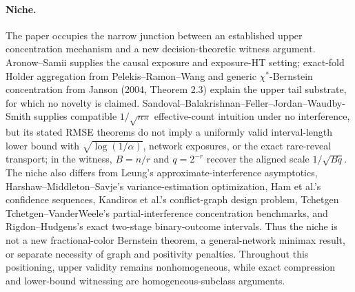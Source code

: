 \documentclass{article}
\begin{document}
\paragraph{Niche.} The paper occupies the narrow junction between an established upper concentration mechanism and a new decision-theoretic witness argument. Aronow--Samii supplies the causal exposure and exposure-HT setting; exact-fold Holder aggregation from Pelekis--Ramon--Wang and generic \(\chi^*\)-Bernstein concentration from Janson (2004, Theorem 2.3) explain the upper tail substrate, for which no novelty is claimed. Sandoval--Balakrishnan--Feller--Jordan--Waudby-Smith supplies compatible \(1/\sqrt{n\pi}\) effective-count intuition under no interference, but its stated RMSE theorems do not imply a uniformly valid interval-length lower bound with \(\sqrt{\log(1/\alpha)}\), network exposures, or the exact rare-reveal transport; in the witness, \(B=n/r\) and \(q=2^{-r}\) recover the aligned scale \(1/\sqrt{Bq}\). The niche also differs from Leung's approximate-interference asymptotics, Harshaw--Middleton--Savje's variance-estimation optimization, Ham et al.'s confidence sequences, Kandiros et al.'s conflict-graph design problem, Tchetgen Tchetgen--VanderWeele's partial-interference concentration benchmarks, and Rigdon--Hudgens's exact two-stage binary-outcome intervals. Thus the niche is not a new fractional-color Bernstein theorem, a general-network minimax result, or separate necessity of graph and positivity penalties. Throughout this positioning, upper validity remains nonhomogeneous, while exact compression and lower-bound witnessing are homogeneous-subclass arguments.
\end{document}
